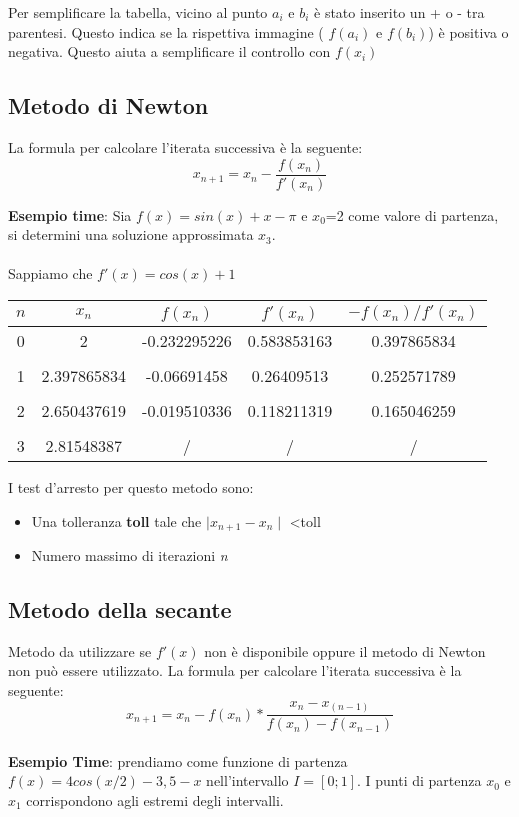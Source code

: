 \noindent
Per semplificare la tabella, vicino al punto $a_i$ e $b_i$ è stato inserito un + o - tra parentesi. Questo indica se la rispettiva immagine ( $f(a_i)$ e $f(b_i)$) è positiva o negativa. Questo aiuta a semplificare il controllo con $f(x_i)$

\newpage

\subsection{Metodo di Newton}
\label{Metodo di Newton}
 La formula per calcolare l'iterata successiva è la seguente:
$$x_{n+1}=x_n-\frac{f(x_n)}{f'(x_n)}$$

\textbf{Esempio time}: Sia $f(x)=sin(x)+x-\pi$ e $x_0$=2 come valore di partenza, si determini una soluzione approssimata $x_3$.
\\
\\
Sappiamo che $f'(x)=cos(x)+1$

\begin{table}[h!]
\centering
\begin{tabular}{|c|c|c|c|c|}
$n$ & $x_n$ & $f(x_n)$ & $f'(x_n)$ &$-f(x_n)/f'(x_n)$ \\ 
\hline
0 & 2 & -0.232295226 & 0.583853163 & 0.397865834\\
& & & &\\
1 & 2.397865834 & -0.06691458 & 0.26409513 & 0.252571789 \\
& & & &\\
2 & 2.650437619 & -0.019510336 & 0.118211319 & 0.165046259 \\
& & & & \\
3 & 2.81548387 & / & / & /
\end{tabular}
\end{table}
\noindent
I test d'arresto per questo metodo sono:
\begin{itemize}
\item Una tolleranza \textbf{toll} tale che $\mid x_{n+1}-x_n \mid$ <toll
\item Numero massimo di iterazioni \textit{n}
\end{itemize}

\pagebreak

\subsection{Metodo della secante}
\label{Metodo della secante}
Metodo da utilizzare se $f'(x)$ non è disponibile oppure il metodo di Newton non può essere utilizzato. La formula per calcolare l'iterata successiva è la seguente:
$$x_{n+1}=x_n-f(x_n)*\frac{x_n-x_{(n-1)}}{f(x_n)-f(x_{n-1})}$$
\\ 
\textbf{Esempio Time}: prendiamo come funzione di partenza $f(x)=4cos(x/2)-3,5-x$ nell'intervallo $I=[0;1]$. I punti di partenza $x_0$ e $x_1$ corrispondono agli estremi degli intervalli.

